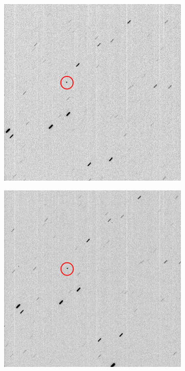\begin{figure}[!h]
    \begin{subfigure}{.3\textwidth}
        \centering
        \includegraphics[width=\textwidth]{images/StreakPoint1.png}
        \label{fig:streakpoint1}
    \end{subfigure}
    \hfill
    \begin{subfigure}{.3\textwidth}
        \centering
        \includegraphics[width=\textwidth]{images/StreakPoint2.png}

\end{subfigure}
\end{figure}
